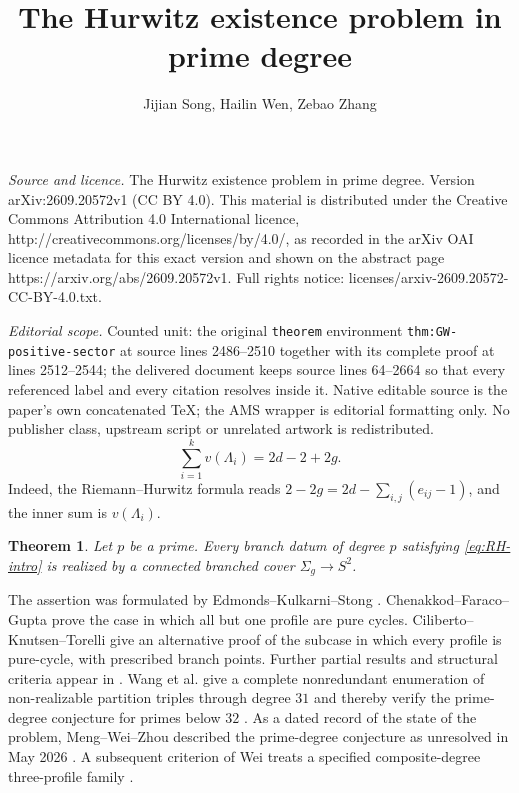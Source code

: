 \documentclass[10pt,a4paper]{amsart}
\newtheorem{theorem}{Theorem}[section]
\numberwithin{equation}{section}
\begin{document}
\title[The Hurwitz existence problem in prime degree]{The Hurwitz existence problem in prime degree}
\author{Jijian Song, Hailin Wen, Zebao Zhang}
\date{}
\maketitle
\noindent\emph{Source and licence.} The Hurwitz existence problem in prime degree. Version arXiv:2609.20572v1 (CC BY 4.0). This material is distributed under the Creative Commons Attribution 4.0 International licence, http://creativecommons.org/licenses/by/4.0/, as recorded in the arXiv OAI licence metadata for this exact version and shown on the abstract page https://arxiv.org/abs/2609.20572v1. Full rights notice: licenses/arxiv-2609.20572-CC-BY-4.0.txt.\par\smallskip
\noindent\textit{Editorial scope.} Counted unit: the original \texttt{theorem} environment \texttt{thm:GW-positive-sector} at source lines 2486--2510 together with its complete proof at lines 2512--2544; the delivered document keeps source lines 64--2664 so that every referenced label and every citation resolves inside it. Native editable source is the paper's own concatenated TeX; the AMS wrapper is editorial formatting only. No publisher class, upstream script or unrelated artwork is redistributed.
\begin{equation}\label{eq:RH-intro}
 \sum_{i=1}^{k}v(\Lambda_i)=2d-2+2g.
\end{equation}
Indeed, the Riemann--Hurwitz formula reads
$2-2g=2d-\sum_{i,j}(e_{ij}-1)$, and the inner sum is
$v(\Lambda_i)$.

\begin{theorem}\label{thm:main}
Let $p$ be a prime.  Every branch datum of degree $p$ satisfying
\eqref{eq:RH-intro} is realized by a connected branched cover
$\Sigma_g\to S^2$.
\end{theorem}

The assertion was formulated by Edmonds--Kulkarni--Stong
\cite[p.~787]{EKS}.  Chenakkod--Faraco--Gupta
\cite[Corollary~9.6]{ChenakkodFaracoGupta} prove the case in which all but
one profile are pure cycles.  Ciliberto--Knutsen--Torelli
\cite[Theorem~0.1]{CilibertoKnutsenTorelli} give an alternative proof of the
subcase in which every profile is pure-cycle, with prescribed branch points.
Further partial results and structural criteria appear in
\cite{PascaliPetronio,BaroniPetronio,PakovichFiber,WeiRational}.
Wang et al. give a complete nonredundant enumeration of non-realizable
partition triples through degree $31$ and thereby verify the prime-degree
conjecture for primes below $32$ \cite{WangComputational}.  As a dated record
of the state of the problem, Meng--Wei--Zhou described the prime-degree
conjecture as unresolved in May 2026 \cite[Introduction]{MengWeiZhou}.  A
subsequent criterion of Wei treats a specified composite-degree
three-profile family \cite{WeiThreeBranch}.
\end{document}
